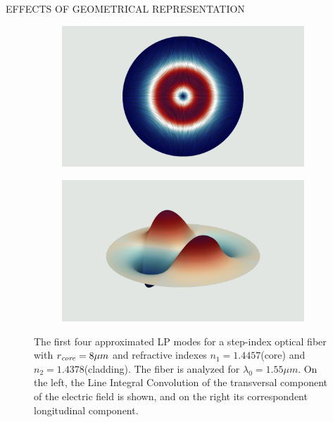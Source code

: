 \documentclass[debug]{beamer} %
\begin{document}
\begin{frame}
\begin{minipage}[t]{0.45\textwidth}
\begin{block}{\boxnumber EFFECTS OF GEOMETRICAL REPRESENTATION}
\begin{figure}[hb]
\begin{mdframed}[backgroundcolor=bggrey]
					\begin{subfigure}[b]{.4999\textwidth}
						\centering
						\includegraphics[width=1\linewidth]{images/et3posterStepFiber.png}%
					\end{subfigure}\hfill
					\begin{subfigure}[b]{.4999\textwidth}
						\centering
						\includegraphics[width=1\linewidth]{images/ez3posterStepFiber.png}%
					\end{subfigure}
				\end{mdframed}
				\caption{The first four approximated LP modes for a step-index optical fiber with $r_{\text{\emph{core}}}=8\mu m$ and refractive indexes $n_1 =1.4457$(core) and $n_2 =1.4378$(cladding). The fiber is analyzed for $\lambda_0=1.55\mu m$. On the left, the Line Integral Convolution of the transversal component of the electric field is shown, and on the right its correspondent longitudinal component.}
				\label{fig:plot-step}
			\end{figure}
		\end{block}
    \end{minipage}\hspace{2cm}%

\end{frame}
\end{document}
